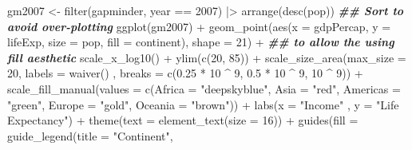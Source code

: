 \documentclass[
]{article}
\newenvironment{Shaded}{\begin{snugshade}}{\end{snugshade}}
\newcommand{\AttributeTok}[1]{\textcolor[rgb]{0.77,0.63,0.00}{#1}}
\newcommand{\DecValTok}[1]{\textcolor[rgb]{0.00,0.00,0.81}{#1}}
\newcommand{\DocumentationTok}[1]{\textcolor[rgb]{0.56,0.35,0.01}{\textbf{\textit{#1}}}}
\newcommand{\FloatTok}[1]{\textcolor[rgb]{0.00,0.00,0.81}{#1}}
\newcommand{\FunctionTok}[1]{\textcolor[rgb]{0.00,0.00,0.00}{#1}}
\newcommand{\NormalTok}[1]{#1}
\newcommand{\OtherTok}[1]{\textcolor[rgb]{0.56,0.35,0.01}{#1}}
\newcommand{\SpecialCharTok}[1]{\textcolor[rgb]{0.00,0.00,0.00}{#1}}
\newcommand{\StringTok}[1]{\textcolor[rgb]{0.31,0.60,0.02}{#1}}
\begin{document}
\begin{Shaded}
\begin{Highlighting}[]
\NormalTok{gm2007 }\OtherTok{\textless{}{-}} \FunctionTok{filter}\NormalTok{(gapminder, year }\SpecialCharTok{==} \DecValTok{2007}\NormalTok{) }\SpecialCharTok{|\textgreater{}}
  \FunctionTok{arrange}\NormalTok{(}\FunctionTok{desc}\NormalTok{(pop)) }\DocumentationTok{\#\# Sort to avoid over{-}plotting}
\FunctionTok{ggplot}\NormalTok{(gm2007) }\SpecialCharTok{+}
  \FunctionTok{geom\_point}\NormalTok{(}\FunctionTok{aes}\NormalTok{(}\AttributeTok{x =}\NormalTok{ gdpPercap,}
                 \AttributeTok{y =}\NormalTok{ lifeExp,}
                 \AttributeTok{size =}\NormalTok{ pop,}
                 \AttributeTok{fill =}\NormalTok{ continent),}
             \AttributeTok{shape =} \DecValTok{21}\NormalTok{) }\SpecialCharTok{+} \DocumentationTok{\#\# to allow the using \textquotesingle{}fill\textquotesingle{} aesthetic}
  \FunctionTok{scale\_x\_log10}\NormalTok{() }\SpecialCharTok{+}
  \FunctionTok{ylim}\NormalTok{(}\FunctionTok{c}\NormalTok{(}\DecValTok{20}\NormalTok{, }\DecValTok{85}\NormalTok{)) }\SpecialCharTok{+}
  \FunctionTok{scale\_size\_area}\NormalTok{(}\AttributeTok{max\_size =} \DecValTok{20}\NormalTok{,}
                  \AttributeTok{labels =} \FunctionTok{waiver}\NormalTok{() ,}
                  \AttributeTok{breaks =} \FunctionTok{c}\NormalTok{(}\FloatTok{0.25} \SpecialCharTok{*} \DecValTok{10} \SpecialCharTok{\^{}} \DecValTok{9}\NormalTok{, }\FloatTok{0.5} \SpecialCharTok{*} \DecValTok{10} \SpecialCharTok{\^{}} \DecValTok{9}\NormalTok{, }\DecValTok{10} \SpecialCharTok{\^{}} \DecValTok{9}\NormalTok{)) }\SpecialCharTok{+}
  \FunctionTok{scale\_fill\_manual}\NormalTok{(}\AttributeTok{values =} \FunctionTok{c}\NormalTok{(}\AttributeTok{Africa =} \StringTok{"deepskyblue"}\NormalTok{,}
                               \AttributeTok{Asia =} \StringTok{"red"}\NormalTok{,}
                               \AttributeTok{Americas =} \StringTok{"green"}\NormalTok{,}
                               \AttributeTok{Europe =} \StringTok{"gold"}\NormalTok{,}
                               \AttributeTok{Oceania =} \StringTok{"brown"}\NormalTok{)) }\SpecialCharTok{+}
  \FunctionTok{labs}\NormalTok{(}\AttributeTok{x =} \StringTok{"Income"}\NormalTok{ , }\AttributeTok{y =} \StringTok{"Life Expectancy"}\NormalTok{) }\SpecialCharTok{+}
  \FunctionTok{theme}\NormalTok{(}\AttributeTok{text =} \FunctionTok{element\_text}\NormalTok{(}\AttributeTok{size =} \DecValTok{16}\NormalTok{)) }\SpecialCharTok{+}
  \FunctionTok{guides}\NormalTok{(}\AttributeTok{fill =} \FunctionTok{guide\_legend}\NormalTok{(}\AttributeTok{title =} \StringTok{"Continent"}\NormalTok{,}

\end{Highlighting}
\end{Shaded}
\end{document}

